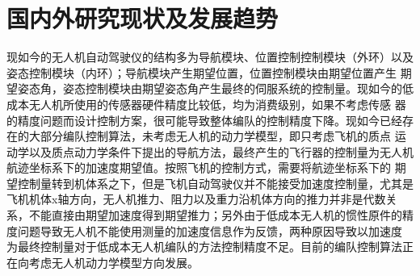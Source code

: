 \section{国内外研究现状及发展趋势}
现如今的无人机自动驾驶仪的结构多为导航模块、位置控制控制模块（外环）以及姿态控制模块（内环）；导航模块产生期望位置，位置控制模块由期望位置产生
期望姿态角，姿态控制模块由期望姿态角产生最终的伺服系统的控制量。现如今的低成本无人机所使用的传感器硬件精度比较低，均为消费级别，如果不考虑传感
器的精度问题而设计控制方案，很可能导致整体编队的控制精度下降。现如今已经存在的大部分编队控制算法，未考虑无人机的动力学模型，即只考虑飞机的质点
运动学以及质点动力学条件下提出的导航方法，最终产生的飞行器的控制量为无人机航迹坐标系下的加速度期望值。按照飞机的控制方式，需要将航迹坐标系下的
期望控制量转到机体系之下，但是飞机自动驾驶仪并不能接受加速度控制量，尤其是飞机机体x轴方向，无人机推力、阻力以及重力沿机体方向的推力并非是代数关
系，不能直接由期望加速度得到期望推力；另外由于低成本无人机的惯性原件的精度问题导致无人机不能使用测量的加速度信息作为反馈，两种原因导致以加速度
为最终控制量对于低成本无人机编队的方法控制精度不足。目前的编队控制算法正在向考虑无人机动力学模型方向发展。
